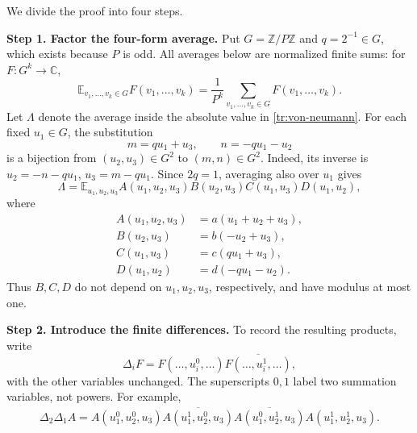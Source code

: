 \documentclass[twoside]{aomart}
\makeatletter
\theoremstyle{paperplain}
\theoremstyle{paperdefinition}
\renewenvironment{proof}[1][\proofname]{\par\pushQED{\qed}%
  \normalfont\topsep6\p@\@plus3\p@\relax\trivlist
  \item[\hskip\labelsep\itshape #1\@addpunct{.}]\ignorespaces
}{\popQED\endtrivlist\@endpefalse}
\newcommand{\E}{\mathbb E}
\newcommand{\Z}{\mathbb Z}
\newcommand{\C}{\mathbb C}
\numberwithin{equation}{section}
\makeatother
\begin{document}
\begin{proof}
We divide the proof into four steps.

\medskip
\noindent\textbf{Step 1. Factor the four-form average.}
Put $G=\Z/P\Z$ and $q=2^{-1}\in G$, which exists because $P$
is odd. All averages below are normalized finite sums: for
$F:G^k\to\C$,
\begin{equation*}
 \E_{v_1,\ldots,v_k\in G}F(v_1,\ldots,v_k)
 =\frac1{P^k}\sum_{v_1,\ldots,v_k\in G}F(v_1,\ldots,v_k).
\end{equation*}
Let $\Lambda$ denote the average inside the absolute value in
\eqref{tr:von-neumann}. For each fixed $u_1\in G$, the substitution
\begin{equation*}
 m=qu_1+u_3,\qquad n=-qu_1-u_2
\end{equation*}
is a bijection from $(u_2,u_3)\in G^2$ to $(m,n)\in G^2$.
Indeed, its inverse is $u_2=-n-qu_1$, $u_3=m-qu_1$.
Since $2q=1$, averaging also over $u_1$ gives
\begin{equation}
 \Lambda=\E_{u_1,u_2,u_3}
    A(u_1,u_2,u_3)B(u_2,u_3)C(u_1,u_3)D(u_1,u_2),
 \label{tr:four-form-factorization}
\end{equation}
where
\begin{equation*}
 \begin{aligned}
 A(u_1,u_2,u_3)&=a(u_1+u_2+u_3),\\
 B(u_2,u_3)&=b(-u_2+u_3),\\
 C(u_1,u_3)&=c(qu_1+u_3),\\
 D(u_1,u_2)&=d(-qu_1-u_2).
 \end{aligned}
\end{equation*}
Thus $B,C,D$ do not depend on $u_1,u_2,u_3$, respectively, and
have modulus at most one.

\medskip
\noindent\textbf{Step 2. Introduce the finite differences.}
To record the resulting products, write
\begin{equation*}
 \Delta_iF=F(\ldots,u_i^0,\ldots)
                 \overline{F(\ldots,u_i^1,\ldots)},
\end{equation*}
with the other variables unchanged. The superscripts $0,1$ label
two summation variables, not powers. For example,
\begin{equation*}
 \begin{aligned}
 \Delta_2\Delta_1A
=A(u_1^0,u_2^0,u_3)\overline{A(u_1^1,u_2^0,u_3)}
\overline{A(u_1^0,u_2^1,u_3)}A(u_1^1,u_2^1,u_3).
 \end{aligned}
\end{equation*}


\end{proof}
\end{document}
